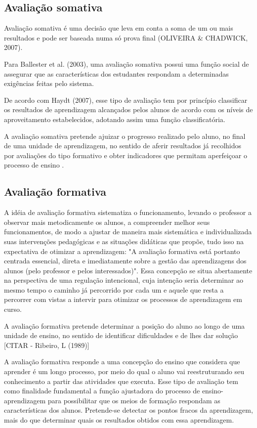 \documentclass[
	12pt,				%
	openright,			%
	oneside,
	a4paper,			%
	english,			%
	french,				%
	spanish,			%
	brazil,				%
	]{abntex2}
\begin{document}
\subsection{Avaliação somativa}
\label{sec:AvaSom}
Avaliação somativa é uma decisão que leva em conta a soma de um ou mais resultados e pode ser baseada numa só prova final {\color{red}(OLIVEIRA & CHADWICK, 2007)}.

Para {\color{red}Ballester et al. (2003)}, uma avaliação somativa possui uma função social de assegurar que as características dos estudantes respondam a determinadas exigências feitas pelo sistema.

De acordo com {\color{red}Haydt (2007)}, esse tipo de avaliação tem por princípio classificar os resultados de aprendizagem alcançados pelos alunos de acordo com os níveis de aproveitamento estabelecidos, adotando assim uma função classificatória.

A avaliação somativa pretende ajuizar o progresso realizado pelo aluno, no final de uma unidade de aprendizagem, no sentido de aferir resultados já recolhidos por avaliações do tipo formativo e obter indicadores que permitam aperfeiçoar o processo de ensino \cite{kraemer2005avaliaccao}.

\subsection{Avaliação formativa}
\label{sec:AvaFor}
A idéia de avaliação formativa sistematiza o funcionamento, levando o professor a
observar mais metodicamente os alunos, a compreender melhor seus funcionamentos, de modo
a ajustar de maneira mais sistemática e individualizada suas intervenções pedagógicas e as
situações didáticas que propõe, tudo isso na expectativa de otimizar a aprendizagem: "A
avaliação formativa está portanto centrada essencial, direta e imediatamente sobre a gestão
das aprendizagens dos alunos (pelo professor e pelos interessados)". Essa concepção se situa
abertamente na perspectiva de uma regulação intencional, cuja intenção seria determinar ao
mesmo tempo o caminho já percorrido por cada um e aquele que resta a percorrer com vistas a
intervir para otimizar os processos de aprendizagem em curso. \cite{perrenoud1999avaliaccao}

A avaliação formativa pretende determinar a posição do aluno ao longo de uma unidade de ensino, no sentido de identificar dificuldades e de lhes dar solução {\color{red} [CITAR - Ribeiro, L (1989)]}

A avaliação formativa responde a uma concepção do ensino que considera que aprender é um longo processo, por meio do qual o aluno vai reestruturando seu conhecimento a partir das atividades que executa. Esse tipo de avaliação tem como finalidade fundamental a função ajustadora do processo de ensino-aprendizagem para possibilitar que os meios de formação respondam as características dos alunos. Pretende-se detectar os pontos fracos da aprendizagem, mais do que determinar quais os resultados obtidos com essa aprendizagem. \cite{jorba2003funccao}
\end{document}
